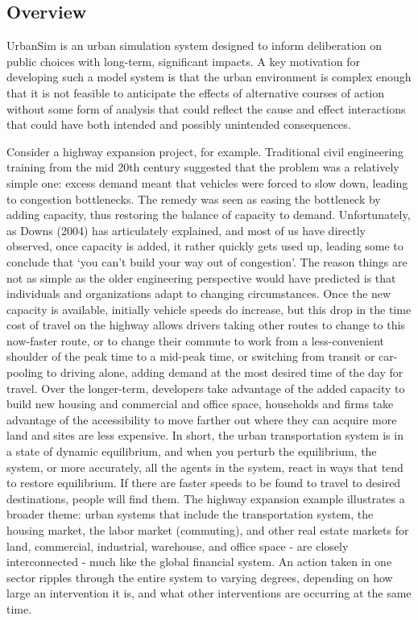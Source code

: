 \subsection{Overview}

UrbanSim is an urban simulation system designed to inform deliberation on public choices with
long-term, significant impacts.  A key motivation 
for developing such a model system is that the urban environment
is complex enough that it is not feasible to anticipate the effects
of alternative courses of action without some form of analysis that
could reflect the cause and effect interactions that could have both intended and possibly unintended consequences.

Consider a highway expansion project, for example.  Traditional civil engineering training from the mid 20th century suggested that the problem was a relatively simple one: excess demand meant that vehicles were forced to slow down, leading to congestion bottlenecks.  The remedy was seen as easing the bottleneck by adding capacity, thus restoring the balance of capacity to demand.  Unfortunately, as Downs (2004) has articulately explained, and most of us have directly observed, once capacity is added, it rather quickly gets used up, leading some to conclude that `you can't build your way out of congestion'. The reason things are not as simple as the older engineering perspective would have predicted is that individuals and organizations adapt to changing circumstances.  Once the new capacity is available, initially vehicle speeds do increase, but this drop in the time cost of travel on the highway allows drivers taking other routes to change to this now-faster route, or to change their commute to work from a less-convenient shoulder of the peak time to a mid-peak time, or switching from transit or car-pooling to driving alone, adding demand at the most desired time of the day for travel.  Over the longer-term, developers take advantage of the added capacity to build new housing and commercial and office space, households and firms take advantage of the accessibility to move farther out where they can acquire more land and sites are less expensive.  In short, the urban transportation system is in a state of dynamic equilibrium, and when you perturb the equilibrium, the system, or more accurately, all the agents in the system, react in ways that tend to restore equilibrium.  If there are faster speeds to be found to travel to desired destinations, people will find them.
%
The highway expansion example illustrates a broader theme: urban systems that include the transportation system, the housing market, the labor market (commuting), and other real estate markets for land, commercial, industrial, warehouse, and office space - are closely interconnected - much like the global financial system.  An action taken in one sector ripples through the entire system to varying degrees, depending on how large an intervention it is, and what other interventions are occurring at the same time.

